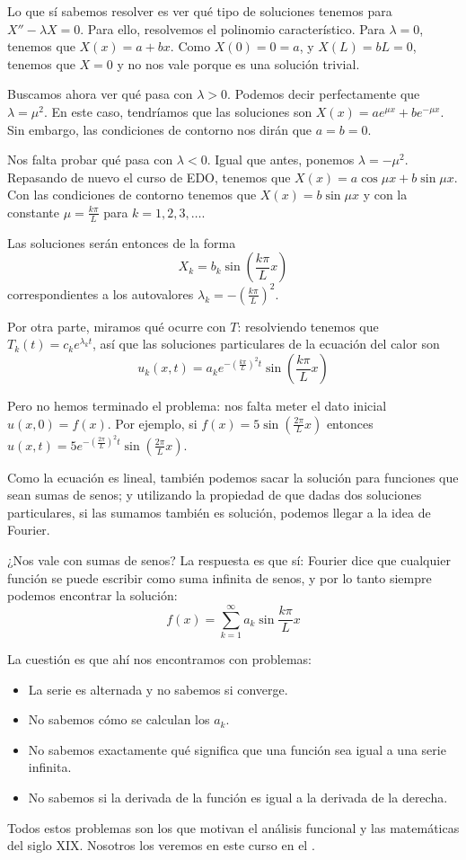 Lo que sí sabemos resolver es ver qué tipo de soluciones tenemos para $X'' - λX = 0$. Para ello, resolvemos el polinomio característico. Para $λ = 0$, tenemos que $X(x) = a+bx$. Como $X(0) = 0 = a$, y $X(L) = bL = 0$, tenemos que $X = 0$ y no nos vale porque es una solución trivial.

Buscamos ahora ver qué pasa con $λ > 0$. Podemos decir perfectamente que $λ = μ^2$. En este caso, tendríamos que las soluciones son $X(x) = ae^{μx} + be^{-μx}$. Sin embargo, las condiciones de contorno nos dirán que $a = b = 0$.

Nos falta probar qué pasa con $λ < 0$. Igual que antes, ponemos $λ = -μ^2$. Repasando de nuevo el curso de EDO, tenemos que $X(x) = a \cos μx + b \sin μx$. Con las condiciones de contorno tenemos que $X(x) = b \sin μx$ y con la constante $μ = \frac{kπ}{L}$ para $k = 1,2,3,\dotsc$.

Las soluciones serán entonces de la forma \[ X_k = b_k \sin (\frac{kπ}{L} x)\] correspondientes a los autovalores $λ_k = -\left(\frac{kπ}{L}\right)^2$. %

Por otra parte, miramos qué ocurre con $T$: resolviendo tenemos que $T_k(t) = c_k e^{λ_k t}$, así que las soluciones particulares de la ecuación del calor son \[ u_k(x,t) = a_k e^{-\left(\frac{kπ}{L}\right)^2t} \sin (\frac{kπ}{L} x) \]

Pero no hemos terminado el problema: nos falta meter el dato inicial $u(x,0) = f(x)$. Por ejemplo, si $f(x) = 5 \sin (\frac{2π}{L} x)$ entonces $u(x,t) = 5 e^{-\left(\frac{2π}{L}\right)^2t} \sin (\frac{2π}{L} x)$.

Como la ecuación es lineal, también podemos sacar la solución para funciones que sean sumas de senos; y utilizando la propiedad de que dadas dos soluciones particulares, si las sumamos también es solución, podemos llegar a la idea de Fourier.

¿Nos vale con sumas de senos? La respuesta es que sí: Fourier dice que cualquier función se puede escribir como suma infinita de senos, y por lo tanto siempre podemos encontrar la solución: \[ f(x) = \sum_{k=1}^∞ a_k \sin \frac{kπ}{L} x\]

La cuestión es que ahí nos encontramos con problemas:
\begin{itemize}
	\item La serie es alternada y no sabemos si converge.
	\item No sabemos cómo se calculan los $a_k$.
	\item No sabemos exactamente qué significa que una función sea igual a una serie infinita.
	\item No sabemos si la derivada de la función es igual a la derivada de la derecha.
\end{itemize}

Todos estos problemas son los que motivan el análisis funcional y las matemáticas del siglo XIX. Nosotros los veremos en este curso en el .
